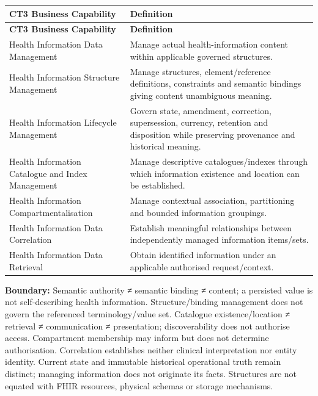 \label{rad:business:652}
\begingroup\small\setlength{\TableWidth}{\dimexpr\linewidth-4\tabcolsep-3\arrayrulewidth\relax}
\begin{longtable}{|>{\raggedright\arraybackslash}p{0.35\TableWidth}|>{\raggedright\arraybackslash}p{0.65\TableWidth}|}
\hline\rowcolor{TableHead}\textbf{CT3 Business Capability} & \textbf{Definition}\\\hline\endfirsthead
\hline\rowcolor{TableHead}\textbf{CT3 Business Capability} & \textbf{Definition}\\\hline\endhead
\hline\endfoot
Health Information Data Management & Manage actual health-information content within applicable governed structures.\\\hline
Health Information Structure Management & Manage structures, element/\allowbreak{}reference definitions, constraints and semantic bindings giving content unambiguous meaning.\\\hline
Health Information Lifecycle Management & Govern state, amendment, correction, supersession, currency, retention and disposition while preserving provenance and historical meaning.\\\hline
Health Information Catalogue and Index Management & Manage descriptive catalogues/\allowbreak{}indexes through which information existence and location can be established.\\\hline
Health Information Compartmentalisation & Manage contextual association, partitioning and bounded information groupings.\\\hline
Health Information Data Correlation & Establish meaningful relationships between independently managed information items/\allowbreak{}sets.\\\hline
Health Information Data Retrieval & Obtain identified information under an applicable authorised request/\allowbreak{}context.\\\hline
\end{longtable}\endgroup
{}\label{rad:business:662}

\textbf{Boundary:} Semantic authority ≠ semantic binding ≠ content; a persisted value is not self-describing health information. Structure/\allowbreak{}binding management does not govern the referenced terminology/\allowbreak{}value set. Catalogue existence/\allowbreak{}location ≠ retrieval ≠ communication ≠ presentation; discoverability does not authorise access. Compartment membership may inform but does not determine authorisation. Correlation establishes neither clinical interpretation nor entity identity. Current state and immutable historical operational truth remain distinct; managing information does not originate its facts. Structures are not equated with FHIR resources, physical schemas or storage mechanisms.

